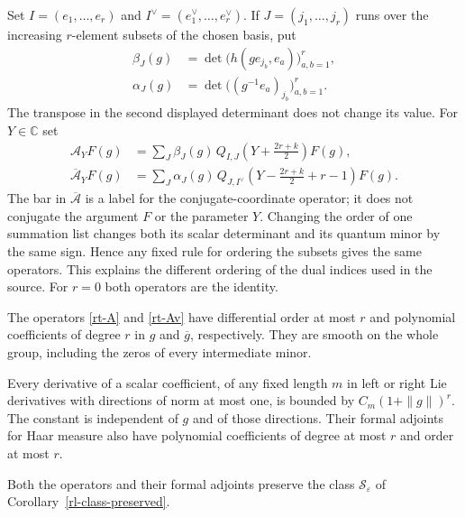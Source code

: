 Set $I=(e_1,\ldots,e_r)$ and
$I^\vee=(e_1^\vee,\ldots,e_r^\vee)$.  If
$J=(j_1,\ldots,j_r)$ runs over the increasing $r$-element
subsets of the chosen basis, put
\begin{align}
 \beta_J(g)&=\det\bigl(h(ge_{j_b},e_a)\bigr)_{a,b=1}^{r},
                                                        \label{rt-beta}\\
 \alpha_J(g)&=\det\bigl((g^{-1}e_a)_{j_b}\bigr)_{a,b=1}^{r}.
                                                        \label{rt-alpha}
\end{align}
The transpose in the second displayed determinant does
not change its value.  For $Y\in\mathbb C$ set
\begin{align}
 \mathcal A_YF(g)
   &=\sum_J\beta_J(g)\,
       Q_{I,J}\left(Y+\frac{2r+k}{2}\right)F(g),
                                                   \label{rt-A}\\
 \overline{\mathcal A}_YF(g)
   &=\sum_J\alpha_J(g)\,
       Q_{J,I^\vee}\left(Y-\frac{2r+k}{2}+r-1\right)F(g).
                                                   \label{rt-Av}
\end{align}
The bar in $\overline{\mathcal A}$ is a label for the
conjugate-coordinate operator; it does not conjugate the
argument $F$ or the parameter $Y$.
Changing the order of one summation list changes both
its scalar determinant and its quantum minor by the
same sign.  Hence any fixed rule for ordering the subsets
gives the same operators.  This explains the different
ordering of the dual indices used in the source.
For $r=0$ both operators are the identity.

\begin{proposition}\label{rt-polynomial}
The operators \eqref{rt-A} and \eqref{rt-Av} have
differential order at most $r$ and polynomial coefficients
of degree $r$ in $g$ and $\overline g$, respectively.
They are smooth on the whole group, including the zeros
of every intermediate minor.

Every derivative of a scalar coefficient, of any fixed
length $m$ in left or right Lie derivatives with directions
of norm at most one, is bounded by
$C_m(1+\|g\|)^r$.  The constant is independent of $g$
and of those directions.  Their formal adjoints for
Haar measure also have polynomial coefficients of degree
at most $r$ and order at most $r$.

Both the operators and their formal adjoints preserve the
class $\mathscr S_\varepsilon$ of
Corollary~\ref{rl-class-preserved}.
\end{proposition}

